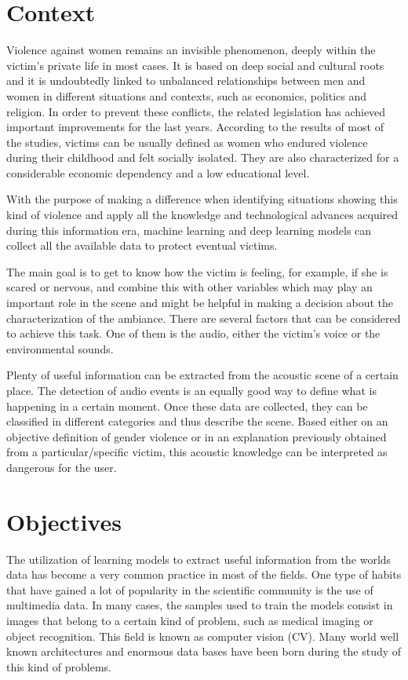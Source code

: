 \section{Context}
	Violence against women remains an invisible phenomenon, deeply within the victim’s private life in most cases. It is based on deep social and cultural roots and it is undoubtedly linked to unbalanced relationships between men and women in different situations and contexts, such as economics, politics and religion. In order to prevent these conflicts, the related legislation has achieved important improvements for the last years. According to the results of most of the studies, victims can be usually defined as women who endured violence during their childhood and felt socially isolated. They are also characterized for a considerable economic dependency and a low educational level.

	With the purpose of making a difference when identifying situations showing this kind of violence and apply all the knowledge and technological advances acquired during this information era, machine learning and deep learning models can collect all the available data to protect eventual victims.
	
	The main goal is to get to know how the victim is feeling, for example, if she is scared or nervous, and combine this with other variables which may play an important role in the scene and might be helpful in making a decision about the characterization of the ambiance. There are several factors that can be considered to achieve this task. One of them is the audio, either the victim's voice or the environmental sounds.
	
	Plenty of useful information can be extracted from the acoustic scene of a certain place. The detection of audio events is an equally good way to define what is happening in a certain moment. Once these data are collected, they can be classified in different categories and thus describe the scene. Based either on an objective definition of gender violence or in an explanation previously obtained from a particular/specific victim, this acoustic knowledge can be interpreted as dangerous for the user.

	
\section{Objectives}
	The utilization of learning models to extract useful information from the worlds data has become a very common practice in most of the fields. One type of habits that have gained a lot of popularity in the scientific community is the use of multimedia data. In many cases, the samples used to train the models consist in images that belong to a certain kind of problem, such as medical imaging or object recognition. This field is known as computer vision (CV). Many world well known architectures and enormous data bases have been born during the study of this kind of problems.
	

